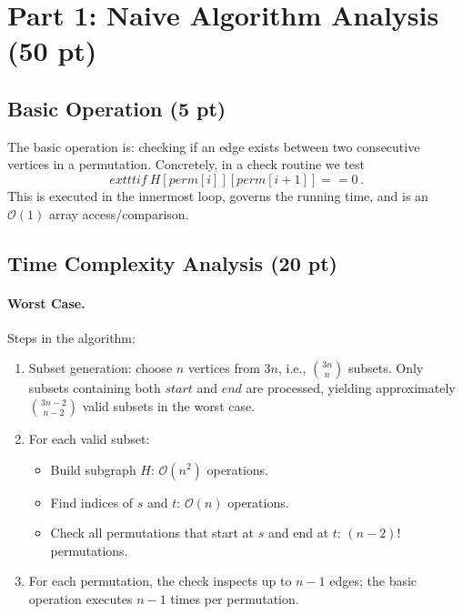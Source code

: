 \documentclass[11pt]{article}
\author{}
\date{\today}
\begin{document}
\onehalfspacing
\maketitle

\section*{Part 1: Naive Algorithm Analysis (50 pt)}

\subsection*{Basic Operation (5 pt)}
The basic operation is: checking if an edge exists between two consecutive vertices in a permutation. Concretely, in a check routine we test
\[
	exttt{if\ H[perm[i]][perm[i+1]] == 0}\,.
\]
This is executed in the innermost loop, governs the running time, and is an $\mathcal{O}(1)$ array access/comparison.

\subsection*{Time Complexity Analysis (20 pt)}

\paragraph{Worst Case.} Steps in the algorithm:
\begin{enumerate}[label=\arabic*.]
	\item Subset generation: choose $n$ vertices from $3n$, i.e., $\binom{3n}{n}$ subsets. Only subsets containing both $\textit{start}$ and $\textit{end}$ are processed, yielding approximately $\binom{3n-2}{\,n-2\,}$ valid subsets in the worst case.
	\item For each valid subset:
		\begin{itemize}
			\item Build subgraph $H$: $\mathcal{O}(n^2)$ operations.
			\item Find indices of $s$ and $t$: $\mathcal{O}(n)$ operations.
			\item Check all permutations that start at $s$ and end at $t$: $(n-2)!$ permutations.
		\end{itemize}
	\item For each permutation, the check inspects up to $n-1$ edges; the basic operation executes $n-1$ times per permutation.
\end{enumerate}
\end{document}
